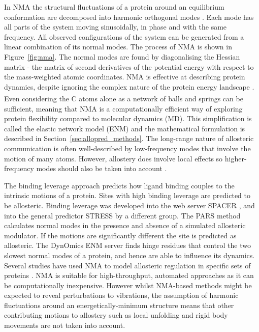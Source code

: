In NMA the structural fluctuations of a protein around an equilibrium conformation are decomposed into harmonic orthogonal modes \cite{Hayward2008}.
Each mode has all parts of the system moving sinusoidally, in phase and with the same frequency.
All observed configurations of the system can be generated from a linear combination of its normal modes.
The process of NMA is shown in Figure~\ref{fig:nma}.
The normal modes are found by diagonalising the Hessian matrix - the matrix of second derivatives of the potential energy with respect to the mass-weighted atomic coordinates.
NMA is effective at describing protein dynamics, despite ignoring the complex nature of the protein energy landscape \cite{Bahar2005}.
Even considering the C\textsuperscript{\textalpha} atoms alone as a network of balls and springs can be sufficient, meaning that NMA is a computationally efficient way of exploring protein flexibility compared to molecular dynamics (MD).
This simplification is called the elastic network model (ENM) and the mathematical formulation is described in Section~\ref{sec:allopred_methods}.
The long-range nature of allosteric communication is often well-described by low-frequency modes that involve the motion of many atoms.
However, allostery does involve local effects so higher-frequency modes should also be taken into account \cite{Collier2013}.

The binding leverage approach \cite{Mitternacht2011} predicts how ligand binding couples to the intrinsic motions of a protein.
Sites with high binding leverage are predicted to be allosteric.
Binding leverage was developed into the web server SPACER \cite{Goncearenco2013}, and into the general predictor STRESS \cite{Clarke2016} by a different group.
The PARS method \cite{Panjkovich2012, Panjkovich2014} calculates normal modes in the presence and absence of a simulated allosteric modulator.
If the motions are significantly different the site is predicted as allosteric.
The DynOmics ENM server \cite{Li2017} finds hinge residues that control the two slowest normal modes of a protein, and hence are able to influence its dynamics.
Several studies have used NMA to model allosteric regulation in specific sets of proteins \cite{Balabin2009, Rodgers2013, Zheng2007, Su2014}.
NMA is suitable for high-throughput, automated approaches as it can be computationally inexpensive.
However whilst NMA-based methods might be expected to reveal perturbations to vibrations, the assumption of harmonic fluctuations around an energetically-minimum structure means that other contributing motions to allostery such as local unfolding and rigid body movements \cite{Motlagh2014} are not taken into account.


